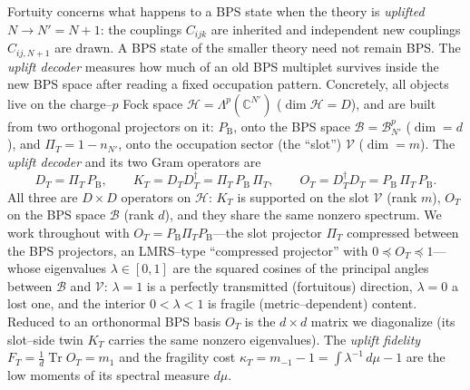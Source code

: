 \documentclass[11pt]{article}
\newcommand{\Tr}{\operatorname{Tr}}
\newcommand{\PB}{P_{\mathrm B}}
\newcommand{\PiT}{\Pi_T}
\newcommand{\KT}{K_T}
\newcommand{\OT}{O_T}
\newcommand{\DT}{D_T}
\newcommand{\dg}{^{\dagger}}
\newif\ifpedagogical
\newcommand{\ped}[1]{\ifpedagogical\par\smallskip{\small\color{pedcol}%
  \leftskip=1.4em\rightskip=1.4em\noindent$\triangleright$~\textit{Plain-language aside.}~#1\par}%
  \par\smallskip\fi}
\begin{document}
Fortuity concerns what happens to a BPS state when the theory is \emph{uplifted}
$N\to N'=N+1$: the couplings $C_{ijk}$ are inherited and independent new couplings
$C_{ij,N+1}$ are drawn. A BPS state of the smaller theory need not remain BPS. The
\emph{uplift decoder} measures how much of an old BPS multiplet survives inside the new BPS
space after reading a fixed occupation pattern. Concretely, all objects live on the charge--$p$ Fock
space $\mathcal H=\Lambda^{p}(\mathbb C^{N'})$ ($\dim\mathcal H=D$), and are built from two orthogonal
projectors on it: $\PB$, onto the BPS space $\mathcal B=\mathcal B_{N'}^{p}$ ($\dim=d$), and
$\PiT=1-n_{N'}$, onto the occupation sector (the ``slot'') $\mathcal V$ ($\dim=m$). The \emph{uplift
decoder} and its two Gram operators are
\begin{equation}
  \DT=\PiT\,\PB,\qquad
  \KT=\DT\DT\dg=\PiT\,\PB\,\PiT ,\qquad
  \OT=\DT\dg\DT=\PB\,\PiT\,\PB .
  \label{eq:decoderdef}
\end{equation}
All three are $D\times D$ operators on $\mathcal H$: $\KT$ is supported on the slot $\mathcal V$
(rank $m$), $\OT$ on the BPS space $\mathcal B$ (rank $d$), and they share the same nonzero spectrum.
We work throughout with $\OT=\PB\PiT\PB$---the slot projector $\PiT$ compressed between the BPS
projectors, an LMRS--type ``compressed projector'' with $0\preceq\OT\preceq1$---whose eigenvalues
$\lambda\in[0,1]$ are the squared cosines of the principal angles between $\mathcal B$ and $\mathcal V$:
$\lambda=1$ is a perfectly transmitted (fortuitous) direction, $\lambda=0$ a lost one, and the interior
$0<\lambda<1$ is fragile (metric--dependent) content. Reduced to an orthonormal BPS basis $\OT$ is the
$d\times d$ matrix we diagonalize (its slot--side twin $\KT$ carries the same nonzero eigenvalues). The
\emph{uplift fidelity} $F_T=\tfrac1d\Tr\OT=m_1$ and the fragility cost
$\kappa_T=m_{-1}-1=\int\lambda^{-1}\,d\mu-1$ are the low moments of its spectral measure $d\mu$.
\ped{``Principal angles'' between two subspaces generalize the angle between two lines: $\lambda=
\cos^2\theta$, so $\lambda=1$ means the two directions coincide (the state sits inside the slot---
perfectly transmitted) and $\lambda=0$ means they are orthogonal (the state has no overlap with the
slot---lost). The whole physics is the \emph{distribution} of these $\lambda$'s, i.e.\ the histogram
$d\mu$; the fidelity is its mean and the dressing cost its inverse--mean.}
\end{document}
